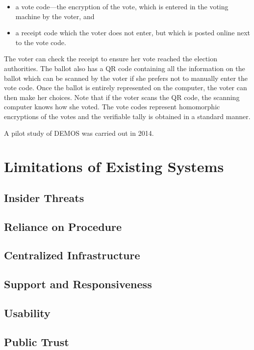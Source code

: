 \begin{itemize}
\item a vote code---the encryption of the vote, which is entered in
  the voting machine by the voter, and
\item a receipt code which the voter does not enter, but which is
  posted online next to the vote code.
\end{itemize}

The voter can check the receipt to ensure her vote reached the
election authorities. The ballot also has a QR code containing all the
information on the ballot which can be scanned by the voter if she
prefers not to manually enter the vote code. Once the ballot is
entirely represented on the computer, the voter can then make her
choices. Note that if the voter scans the QR code, the scanning
computer knows how she voted. The vote codes represent homomorphic
encryptions of the votes and the verifiable tally is obtained in a
standard manner.

A pilot study of DEMOS was carried out in 2014.


\section{Limitations of Existing Systems}
\label{sec:limit-exist-syst}

\subsection{Insider Threats}

\subsection{Reliance on Procedure}

\subsection{Centralized Infrastructure}

\subsection{Support and Responsiveness}

\subsection{Usability}

\subsection{Public Trust}

